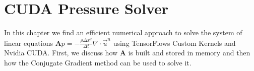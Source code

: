 \chapter{CUDA Pressure Solver}\label{chapter:cudapressuresolver}
In this chapter we find an efficient numerical approach to solve the system of linear equations $\mathbf{A}p = -\frac{\rho \Delta x^2}{\Delta t}\nabla \cdot \vec{u}^n$ using TensorFlows Custom Kernels and Nvidia CUDA. First, we discuss how $\mathbf{A}$ is built and stored in memory and then how the Conjugate Gradient method can be used to solve it. 
